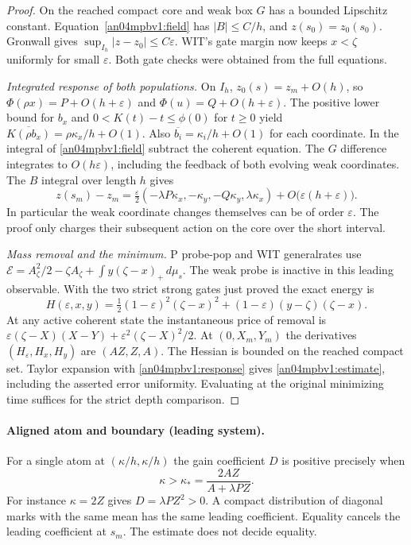 \documentclass[11pt]{article}
\newcommand{\EE}{\mathcal E}
\newcommand{\dd}{\,d}
\begin{document}
\begin{proof}
On the reached compact core and weak box $G$ has a bounded Lipschitz
constant. Equation~\eqref{an04mpbv1:field} has $|B|\le C/h$, and
$z(s_0)=z_0(s_0)$. Gronwall gives
$\sup_{I_h}|z-z_0|\le C\varepsilon$.
WIT's gate margin now keeps $x<\zeta$ uniformly for small
$\varepsilon$. Both gate checks were obtained from the full equations.

\emph{Integrated response of both populations.}
On $I_h$, $z_0(s)=z_m+O(h)$, so
$\Phi(\rho x)=P+O(h+\varepsilon)$ and
$\Phi(u)=Q+O(h+\varepsilon)$. The positive lower bound for $b_x$
and $0<K(t)-t\le\phi(0)$ for $t\ge0$ yield
$\overline{K(\rho b_x)}=\rho\kappa_x/h+O(1)$.
Also $\overline{b_i}=\kappa_i/h+O(1)$ for each coordinate.
In the integral of \eqref{an04mpbv1:field} subtract the coherent
equation. The $G$ difference integrates to $O(h\varepsilon)$, including
the feedback of both evolving weak coordinates. The $B$ integral
over length $h$ gives
\begin{equation}\label{an04mpbv1:response}
 z(s_m)-z_m=\tfrac{\varepsilon}{2}
 (-\lambda P\kappa_x,-\kappa_y,-Q\kappa_y,\lambda\kappa_x)
 +O\big(\varepsilon(h+\varepsilon)\big).
\end{equation}
In particular the weak coordinate changes themselves can be of order
$\varepsilon$. The proof only charges their subsequent action on the
core over the short interval.

\emph{Mass removal and the minimum.}
P probe-pop and WIT generalrates use
$\EE=A_\zeta^2/2-\zeta A_\zeta+\int y(\zeta-x)_+\dd\mu_s$.
The weak probe is inactive in this leading observable.
With the two strict strong gates just proved the exact energy is
\[
 H(\varepsilon,x,y)=\tfrac12(1-\varepsilon)^2(\zeta-x)^2
       +(1-\varepsilon)(y-\zeta)(\zeta-x).
\]
At any active coherent state the instantaneous price of removal is
$\varepsilon(\zeta-X)(X-Y)+\varepsilon^2(\zeta-X)^2/2$.
At $(0,X_m,Y_m)$ the derivatives $(H_\varepsilon,H_x,H_y)$
are $(AZ,Z,A)$. The Hessian is bounded on the reached compact set.
Taylor expansion with \eqref{an04mpbv1:response} gives
\eqref{an04mpbv1:estimate}, including the asserted error uniformity.
Evaluating at the original minimizing time suffices for the strict
depth comparison.
\end{proof}

\paragraph{Aligned atom and boundary (leading system).}
\label{an04mpbv1:threshold}
For a single atom at $(\kappa/h,\kappa/h)$ the gain coefficient $D$ is positive
precisely when
\[
 \kappa>\kappa_*=\frac{2AZ}{A+\lambda P Z}.
\]
For instance $\kappa=2Z$ gives $D=\lambda P Z^2>0$.
A compact distribution of diagonal marks with the same mean has
the same leading coefficient. Equality cancels the leading
coefficient at $s_m$. The estimate does not decide equality.
\end{document}
